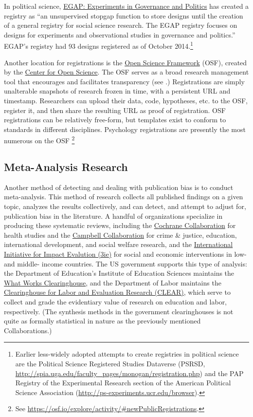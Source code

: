 \documentclass[12pt] {article}
\begin{document}
In political science, \href{http://e-gap.org/design-registration}{EGAP: Experiments in Governance and Politics} has
created a registry as ``an unsupervised stopgap function to store
designs until the creation of a general registry for social science
research. The EGAP registry focuses on designs for experiments and
observational studies in governance and politics.'' EGAP's registry had 93
designs registered as of October 2014.\footnote{Earlier less-widely
  adopted attempts to create registries in political science are the
  Political Science Registered Studies Dataverse (PSRSD,
  \href{../customXml/item1.xml}{http://spia.uga.edu/faculty\_pages/monogan/registration.php})
  and the PAP Registry of the Experimental Research section of the
  American Political Science Association
  (\href{numbering.xml}{http://ps-experiments.ucr.edu/browser}).}

Another location for registrations is the \href{http://osf.io}{Open Science Framework} (OSF), created by the \href{http://centerforopenscience.org/}{Center for Open Science}. The OSF serves as a broad research management tool that encourages and facilitates transparency (see \cite{nosek_scientific_2012}.) Registrations are simply unalterable snapshots of research frozen in time, with a persistent URL and timestamp. Researchers can upload their data, code, hypotheses, etc. to the OSF, register it, and then share the resulting URL as proof of registration. OSF registrations can be relatively free-form, but templates exist to conform to standards in different disciplines. Psychology registrations are presently the most numerous on the OSF \footnote{See \url{https://osf.io/explore/activity/\#newPublicRegistrations}.}

\subsection{Meta-Analysis Research}
Another method of detecting and dealing with publication bias is to conduct meta-analysis. This method of research collects all published findings on a given topic, analyzes the results collectively, and can detect, and attempt to adjust for, publication bias in the literature. A handful of organizations specialize in producing these systematic reviews, including the \href{http://www.cochrane.org}{Cochrane Collaboration} for health studies and the \href{http://www.campbellcollaboration.org/}{Campbell Collaboration} for crime \& justice, education, international development, and social welfare research, and the \href{http://www.3ie.org}{International Initiative for Impact Evalution (3ie)} for social and economic interventions in low- and middle- income countries. The US government supports this type of analysis: the Department of Education's Institute of Education Sciences maintains the \href{http://ies.ed.gov/ncee/wwc/}{What Works Clearinghouse}, and the Department of Labor maintains the \href{http://clear.dol.gov/}{Clearinghouse for Labor and Evaluation Research (CLEAR)}, which serve to collect and grade the evidentiary value of research on education and labor, respectively. (The synthesis methods in the government clearinghouses is not quite as formally statistical in nature as the previously mentioned Collaborations.)
\end{document}
